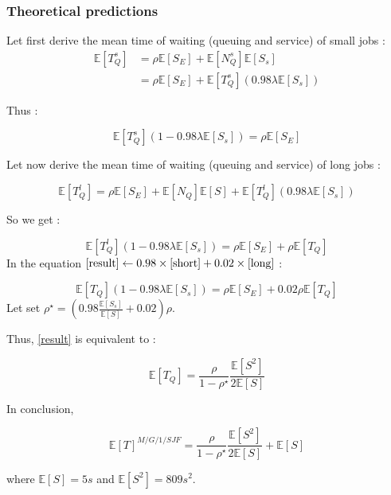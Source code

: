 \documentclass[a4paper]{report}
\begin{document}
\subsubsection*{Theoretical predictions}

Let first derive the mean time of waiting (queuing and service) of small jobs : 
\begin{align*}
\mathbb{E}[T_{Q}^{s}] &= \rho \mathbb{E}[S_{E}] + \mathbb{E}[N_{Q}^{s}] \mathbb{E}[S_{s}] \\
&= \rho \mathbb{E}[S_{E}] + \mathbb{E}[T_{Q}^{s}] (0.98 \lambda \mathbb{E}[S_{s}])
\end{align*}

Thus :

\begin{equation}
\mathbb{E}[T_{Q}^{s}](1-0.98 \lambda \mathbb{E}[S_{s}]) = \rho \mathbb{E}[S_{E}]
\label{short}
\end{equation}

Let now derive the mean time of waiting (queuing and service) of long jobs : 

\[\mathbb{E}[T_{Q}^{l}] = \rho \mathbb{E}[S_{E}] + \mathbb{E}[N_{Q}] \mathbb{E}[S]+\mathbb{E}[T_{Q}^{l}] (0.98 \lambda \mathbb{E}[S_{s}])\]

So we get :

\begin{equation}
\mathbb{E}[T_{Q}^{l}](1-0.98 \lambda \mathbb{E}[S_{s}]) = \rho \mathbb{E}[S_{E}]+\rho \mathbb{E}[T_{Q}]
\label{long}
\end{equation}
\medbreak
In the equation $\eqref{result}\leftarrow 0.98 \times \eqref{short}+0.02 \times \eqref{long}$ :

\begin{equation}
\mathbb{E}[T_{Q}](1-0.98 \lambda \mathbb{E}[S_{s}]) = \rho \mathbb{E}[S_{E}]+0.02\rho \mathbb{E}[T_{Q}]
\label{result}
\end{equation}
\medbreak
Let set $\rho^{\star} = (0.98 \frac{\mathbb{E}[S_{s}]}{\mathbb{E}[S]}+0.02) \rho$. 
\par
Thus, \eqref{result} is equivalent to :


\[\mathbb{E}[T_{Q}]=\frac{\rho}{1-\rho^{\star}}\frac{\mathbb{E}[S^{2}]}{2 \mathbb{E}[S]}\]

In conclusion,

\[\mathbb{E}[T]^{M/G/1/SJF}=\frac{\rho}{1-\rho^{\star}}\frac{\mathbb{E}[S^{2}]}{2 \mathbb{E}[S]}+\mathbb{E}[S]\]

where $\mathbb{E}[S] = 5s$ and $\mathbb{E}[S^{2}] = 809 s^{2}$.
\end{document}
